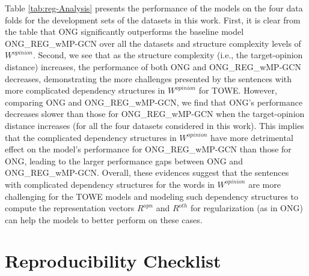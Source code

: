 \documentclass[11pt,a4paper]{article}
\begin{document}
Table \ref{tab:reg-Analysis} presents the performance of the models on the four data folds for the development sets of the datasets in this work. First, it is clear from the table that ONG significantly outperforms the baseline model ONG\_REG\_wMP-GCN over all the datasets and structure complexity levels of $W^{opinion}$. Second, we see that as the structure complexity (i.e., the target-opinion distance) increases, the performance of both ONG and ONG\_REG\_wMP-GCN decreases, demonstrating the more challenges presented by the sentences with more complicated dependency structures in $W^{opinion}$ for TOWE. However, comparing ONG and ONG\_REG\_wMP-GCN, we find that ONG's performance decreases slower than those for ONG\_REG\_wMP-GCN when the target-opinion distance increases (for all the four datasets considered in this work). This implies that the complicated dependency structures in $W^{opinion}$ have more detrimental effect on the model's performance for ONG\_REG\_wMP-GCN than those for ONG, leading to the larger performance gaps between ONG and ONG\_REG\_wMP-GCN. Overall, these evidences suggest that the sentences with complicated dependency structures for the words in $W^{opinion}$ are more challenging for the TOWE models and modeling such dependency structures to compute the representation vectors $R^{opn}$ and $R^{oth}$ for regularization (as in ONG) can help the models to better perform on these cases.







\fi

\iffalse
\section{Reproducibility Checklist}
\label{app:repo}
\end{document}
